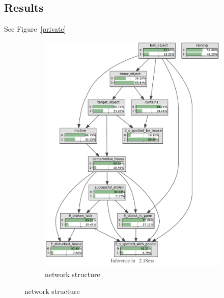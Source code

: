 \subsection{Results}


See Figure~\ref{private}

\begin{figure}[h]
\begin{center}
\begin{subfigure}{.50\textwidth}
\includegraphics[width=\linewidth]{../experiments/StolenLaptopPrivate/bnImage/BNIMAGEStolenLaptopPrivate.pdf}
\caption{network structure}
\label{privatelaptopAcc}
\end{subfigure}
\end{center}


\end{figure}
